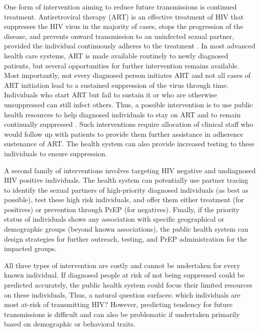 \documentclass[oupdraft]{sysbio}
\begin{document}
One form of intervention aiming to reduce future transmissions is continued treatment. 
Antiretroviral therapy (ART) is an effective treatment of HIV that suppresses the HIV virus in the majority of cases, stops the progression of the disease, and prevents onward transmission to an uninfected sexual partner, provided the individual continuously adheres to the treatment \citep{Cohen2011}.
In most advanced health care systems, ART is made available routinely  to newly diagnosed patients, but several opportunities for further intervention remains available. 
Most importantly, not every diagnosed person initiates ART and not all cases of ART initiation lead to a sustained suppression of the virus through time. 
Individuals who start ART but fail to sustain it or who are otherwise unsuppressed can still infect others. 
Thus, a possible intervention is to use public health resources to help diagnosed individuals to stay on ART and to remain continually suppressed \citep{Poon2016}. 
Such interventions require allocation of clinical staff who would follow up with patients to provide them further assistance in adherence sustenance of ART.
The health system can also provide  increased testing to these individuals to ensure suppression.  

A second family of interventions involves targeting HIV negative and undiagnosed HIV positive individuals.
The health system can potentially use partner tracing \citep{Gotz2014} to identify the sexual partners of high-priority diagnosed individuals (as best as possible), test these high risk individuals, and offer them either treatment (for positives) or prevention through PrEP (for negatives). 
Finally, if the  priority status of individuals shows any association with specific geographical or demographic groups (beyond known associations), the public health system can design strategies for further outreach, testing, and PrEP administration for the impacted groups.

All three types of intervention   are  costly and cannot be undertaken for every known individual.
If diagnosed people at risk of not being suppressed could be predicted accurately, the public health system could focus their limited resources on these individuals,
Thus, a natural question surfaces: which individuals are most at-risk of transmitting HIV? %
However, predicting tendency for future transmissions is difficult and can also be problematic if undertaken primarily based on demographic or behavioral traits.
\end{document}

